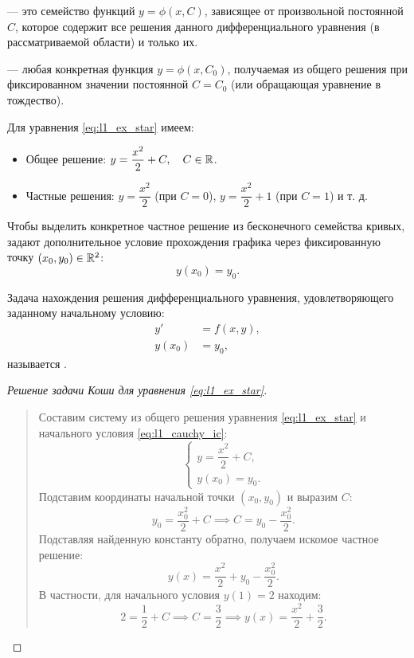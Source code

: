 \begin{definition}
     — это семейство функций $y = \phi(x, C)$,
    зависящее от произвольной постоянной $C$, которое содержит все решения
    данного дифференциального уравнения (в рассматриваемой области) и только
    их.
\end{definition}

\begin{definition}
     — любая конкретная функция $y = \phi(x, C_0)$,
    получаемая из общего решения при фиксированном значении постоянной
    $C = C_0$ (или обращающая уравнение в тождество).
\end{definition}

Для уравнения \eqref{eq:l1_ex_star} имеем:
\begin{itemize}
    \item Общее решение: $y = \dfrac{x^2}{2} + C, \quad C \in \mathbb{R}$.
    \item Частные решения: $y = \dfrac{x^2}{2}$ (при $C = 0$),
    $y = \dfrac{x^2}{2} + 1$ (при $C = 1$) и т. д.
\end{itemize}

Чтобы выделить конкретное частное решение из бесконечного семейства кривых,
задают дополнительное условие прохождения графика через фиксированную точку
$(x_0, y_0) \in \mathbb{R}^2$:
\[
    y(x_0) = y_0.
\]

\begin{definition}
    Задача нахождения решения дифференциального уравнения, удовлетворяющего
    заданному начальному условию:
    \begin{align}
        y' &= f(x, y), \tag{6} \label{eq:l1_cauchy_eq} \\
        y(x_0) &= y_0, \tag{7} \label{eq:l1_cauchy_ic}
    \end{align}
    называется .
\end{definition}

\begin{proof}[Решение задачи Коши для уравнения \eqref{eq:l1_ex_star}]~\\
    \begin{quote}
        Составим систему из общего решения уравнения \eqref{eq:l1_ex_star} и
        начального условия \eqref{eq:l1_cauchy_ic}:
        \[
            \begin{cases}
                y = \dfrac{x^2}{2} + C, \\
                y(x_0) = y_0.
            \end{cases}
        \]
        Подставим координаты начальной точки $(x_0, y_0)$ и выразим $C$:
        \[
            y_0 = \frac{x_0^2}{2} + C \implies C = y_0 - \frac{x_0^2}{2}.
        \]
        Подставляя найденную константу обратно, получаем искомое частное
        решение:
        \[
            y(x) = \frac{x^2}{2} + y_0 - \frac{x_0^2}{2}.
        \]
        В частности, для начального условия $y(1) = 2$ находим:
        \[
            2 = \frac{1}{2} + C \implies C = \frac{3}{2} \implies
            y(x) = \frac{x^2}{2} + \frac{3}{2}.
        \]
    \end{quote}
\end{proof}

